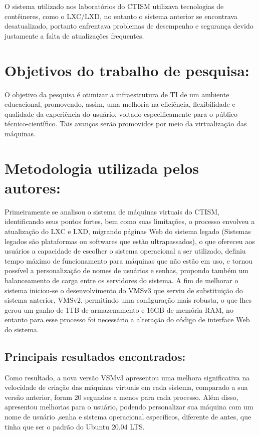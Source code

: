 \documentclass[12pt]{article}
\begin{document}
O sistema utilizado nos laboratórios do CTISM utilizava tecnologias de contêineres, como o LXC/LXD, no entanto o sistema anterior se encontrava desatualizado, portanto enfrentava problemas de desempenho e segurança devido justamente a falta de atualizações frequentes.

\section{Objetivos do trabalho de pesquisa:}


O objetivo da pesquisa é  otimizar a infraestrutura de TI de um ambiente educacional, promovendo, assim, uma melhoria na eficiência, flexibilidade e qualidade da experiência do usuário, voltado especificamente para o público técnico-científico. Tais avanços serão promovidos por meio da virtualização das máquinas.


\section{Metodologia utilizada pelos autores:}

Primeiramente se analisou o sistema de máquinas virtuais do CTISM, identificando seus pontos fortes, bem como suas limitações, o processo envolveu a atualização do LXC e LXD, migrando páginas Web do sistema legado (Sistemas legados são plataformas ou softwares que estão ultrapassados), o que ofereceu aos usuários a capacidade de escolher o sistema operacional a ser utilizado, definiu tempo máximo de funcionamento para máquinas que não estão em uso, e tornou possível a personalização de nomes de usuários e senhas, propondo também um balanceamento de carga entre os servidores do sistema.
A fim de melhorar o sistema iniciou-se o desenvolvimento do VMSv3 que serviu de substituição do sistema anterior, VMSv2, permitindo uma configuração mais robusta,  o que lhes gerou um ganho de 1TB de armazenamento e 16GB de memória RAM, no entanto para esse processo foi necessário a alteração do código de interface Web do sistema.


\subsection{Principais resultados encontrados: }


Como resultado, a nova versão VSMv3 apresentou uma melhora significativa na velocidade de criação das máquinas virtuais em cada sistema, comparado a sua versão anterior, foram 20 segundos a menos para cada processo. Além disso, apresentou melhorias para o usuário, podendo personalizar sua máquina com um nome de usuário ,senha e sistema operacional específicos, diferente de antes, que tinha que ser o padrão do Ubuntu 20.04 LTS.
\end{document}
